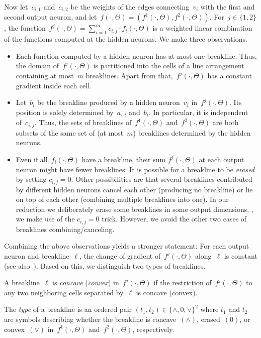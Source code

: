 Now let~$c_{i,1}$ and~$c_{i,2}$ be the weights of the edges connecting~$v_i$ with the first and second output neuron, and let~$f(\cdot, \Theta) = (f^1(\cdot, \Theta), f^2(\cdot, \Theta))$.
For~$j \in \{1,2\}$, the function~$f^j(\cdot, \Theta) = \sum_{i = 1}^m c_{i,j} \cdot f_i(\cdot, \Theta)$ is a weighted linear combination of the functions computed at the hidden neurons.
We make three observations.

\begin{itemize}
    \item Each function computed by a hidden \ReLU neuron has at most one breakline.
    Thus, the domain of~$f^j(\cdot, \Theta)$ is partitioned into the cells of a line arrangement containing at most~$m$ breaklines.
    Apart from that,~$f^j(\cdot, \Theta)$ has a constant gradient inside each cell.

    \item Let~$b_i$ be the breakline produced by a hidden neuron~$v_i$ in~$f^j(\cdot, \Theta)$.
    Its position is solely determined by~$a_{\cdot,i}$ and~$b_i$.
    In particular, it is independent of~$c_{i,j}$.
    Thus, the sets of breaklines of~$f^1(\cdot, \Theta)$ and~$f^2(\cdot, \Theta)$ are both subsets of the same set of (at most~$m$) breaklines determined by the hidden neurons.

    \item Even if all~$f_i(\cdot, \Theta)$ have a breakline, their sum $f^j(\cdot, \Theta)$ at each output neuron might have fewer breaklines:
    It is possible for a breakline to be \emph{erased} by setting $c_{i,j} = 0$.
    Other possibilities are that several breaklines contributed by different hidden neurons cancel each other (producing no breakline) or lie on top of each other (combining multiple breaklines into one).
    In our reduction we deliberately erase some breaklines in some output dimensions, \ie, we make use of the $c_{i,j} = 0$ trick.
    However, we avoid the other two cases of breaklines combining/canceling.
\end{itemize}

Combining
the  %
above observations yields a stronger statement:
For each output neuron and breakline~$\ell$, the change of gradient of~$f^j(\cdot, \Theta)$ 
along~$\ell$ is constant (see also~\cite{Dereich2022_Minimal}).
Based on this, we distinguish two types of breaklines.

\begin{definition}
    A breakline~$\ell$ is \emph{concave} (\emph{convex}) in~$f^j(\cdot,\Theta)$ if the restriction of~$f^j(\cdot,\Theta)$ to any two neighboring cells separated by~$\ell$ is concave (convex).

    The \emph{type} of a breakline is %
an ordered pair  %
$(t_1,t_2) \in \{\wedge, 0, \vee\}^2$  
where $t_1$ and $t_2$ are symbols %
%
describing  whether the breakline is concave~$(\wedge)$, erased~$(0)$, 
or convex~$(\vee)$ in~$f^1(\cdot,\Theta)$ and~$f^2(\cdot,\Theta)$, respectively.
\end{definition}    %

